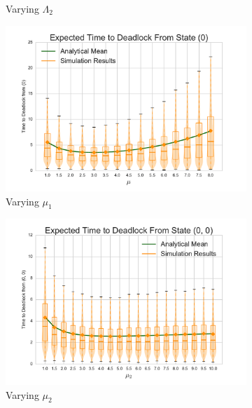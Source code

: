 \documentclass{article}
\begin{document}
\begin{figure}[!htbp]
\begin{subfigure}[b]{0.333\textwidth}
    \caption{Varying $\Lambda_2$}
    \label{fig:2Nms_L2}
  \end{subfigure}
  \begin{subfigure}[b]{0.333\textwidth}
    \includegraphics[width=\textwidth]{images/varymu_1Nms}
    \caption{Varying $\mu_1$}
    \label{fig:2Nms_mu1}
  \end{subfigure}
  \begin{subfigure}[b]{0.333\textwidth}
    \includegraphics[width=\textwidth]{images/varymu2_2Nms}
    \caption{Varying $\mu_2$}
    \label{fig:2Nms_mu2}
  \end{subfigure}
  \begin{subfigure}[b]{0.333\textwidth}

\end{subfigure}
\end{figure}
\end{document}
